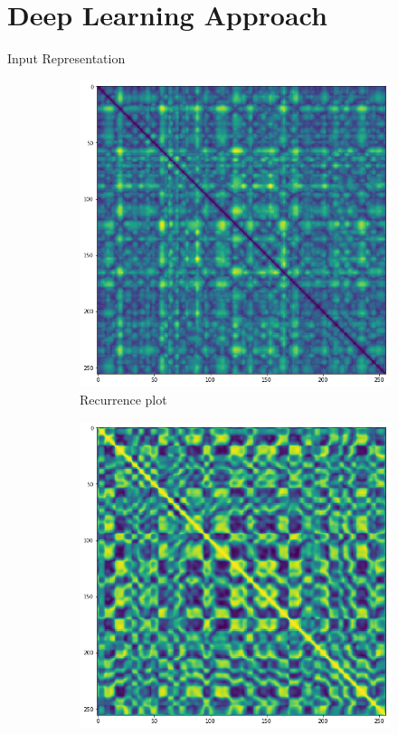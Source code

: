 \documentclass{beamer}
\begin{document}

\section{Deep Learning Approach}


\begin{frame}{Input Representation}
\begin{figure}
\centering
\begin{subfigure}{.5\textwidth}
  \centering
  \includegraphics[width=.9\linewidth]{./Images/chebyshev.png}
  \caption{Recurrence plot}
\end{subfigure}%
\begin{subfigure}{.5\textwidth}
  \centering
  \includegraphics[width=.9\linewidth]{./Images/cs.png}

\end{subfigure}
\end{figure}
\end{frame}
\end{document}
